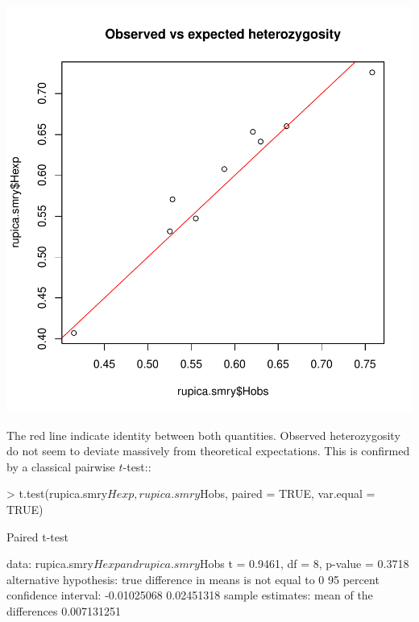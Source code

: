 \documentclass{article}
\begin{document}
\includegraphics{figs/spca-030}

\noindent The red line indicate identity between both quantities.
Observed heterozygosity do not seem to deviate massively from theoretical expectations.
This is confirmed by a classical pairwise $t$-test::
\begin{Schunk}
\begin{Sinput}
> t.test(rupica.smry$Hexp, rupica.smry$Hobs, paired = TRUE, var.equal = TRUE)
\end{Sinput}
\begin{Soutput}
	Paired t-test

data:  rupica.smry$Hexp and rupica.smry$Hobs 
t = 0.9461, df = 8, p-value = 0.3718
alternative hypothesis: true difference in means is not equal to 0 
95 percent confidence interval:
 -0.01025068  0.02451318 
sample estimates:
mean of the differences 
            0.007131251 
\end{Soutput}
\end{Schunk}
~\\
\end{document}
